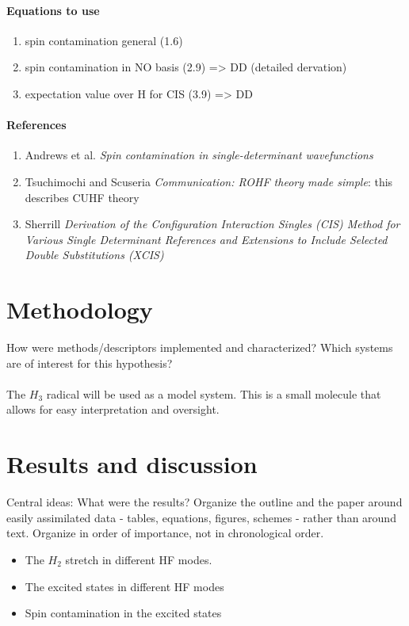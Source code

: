 \documentclass[twoside,twocolumn,9pt]{article}
\begin{document}
\paragraph*{Equations to use}
\begin{enumerate}
  \item spin contamination general (1.6)
  \item spin contamination in NO basis (2.9) => DD (detailed dervation)
  \item expectation value over H for CIS (3.9) => DD
\end{enumerate}
\paragraph*{References}
\begin{enumerate}
  \item Andrews et al. \textit{Spin contamination in single-determinant wavefunctions}
  \item Tsuchimochi and Scuseria \textit{Communication: ROHF theory made simple}: this describes CUHF theory
  \item Sherrill \textit{Derivation of the Configuration Interaction Singles (CIS) Method for Various Single Determinant References and Extensions to Include Selected Double Substitutions (XCIS)}
\end{enumerate}

\section{Methodology}

How were methods/descriptors implemented and characterized? Which systems are of interest for this hypothesis?
\paragraph*{}
The $H_3$ radical will be used as a model system. This is a small molecule that allows for easy interpretation and oversight.
\section{Results and discussion}

Central ideas: What were the results? Organize the outline and the paper around easily assimilated data - tables, equations, figures, schemes - rather than around text. Organize in order of importance, not in chronological order.

\begin{itemize}
    \item The $H_2$ stretch in different HF modes.
    \item The excited states in different HF modes
    \item Spin contamination in the excited states
\end{itemize}
\end{document}
